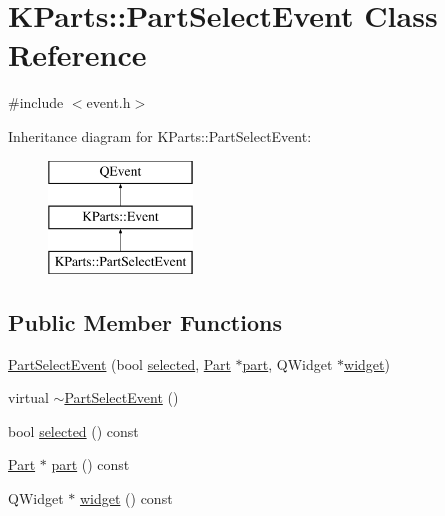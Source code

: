 \hypertarget{classKParts_1_1PartSelectEvent}{\section{K\+Parts\+:\+:Part\+Select\+Event Class Reference}
\label{classKParts_1_1PartSelectEvent}
}


{\ttfamily \#include $<$event.\+h$>$}

Inheritance diagram for K\+Parts\+:\+:Part\+Select\+Event\+:\begin{figure}[H]
\begin{center}
\leavevmode
\includegraphics[height=3.000000cm]{classKParts_1_1PartSelectEvent}
\end{center}
\end{figure}
\subsection*{Public Member Functions}
\begin{DoxyCompactItemize}
\item 
\hyperlink{classKParts_1_1PartSelectEvent_ae31a4b63005a8e7493fd4fa5bd6f5e8d}{Part\+Select\+Event} (bool \hyperlink{classKParts_1_1PartSelectEvent_afbf342d865c918cdb6b856ab4168145f}{selected}, \hyperlink{classKParts_1_1Part}{Part} $\ast$\hyperlink{classKParts_1_1PartSelectEvent_a5e85934aca776852b1e8e25b01160f4e}{part}, Q\+Widget $\ast$\hyperlink{classKParts_1_1PartSelectEvent_a4f3b4a8544692181d2b49ffdeaad21d2}{widget})
\item 
virtual \hyperlink{classKParts_1_1PartSelectEvent_a5f1dc2753bd8a6a44a495fd6d505b312}{$\sim$\+Part\+Select\+Event} ()
\item 
bool \hyperlink{classKParts_1_1PartSelectEvent_afbf342d865c918cdb6b856ab4168145f}{selected} () const 
\item 
\hyperlink{classKParts_1_1Part}{Part} $\ast$ \hyperlink{classKParts_1_1PartSelectEvent_a5e85934aca776852b1e8e25b01160f4e}{part} () const 
\item 
Q\+Widget $\ast$ \hyperlink{classKParts_1_1PartSelectEvent_a4f3b4a8544692181d2b49ffdeaad21d2}{widget} () const 
\end{DoxyCompactItemize}

